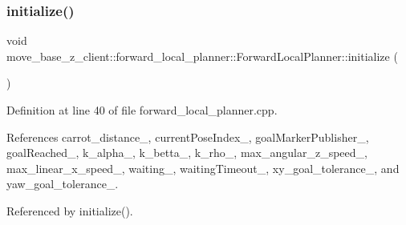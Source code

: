 \subsubsection{\texorpdfstring{initialize()}{initialize()}\hspace{0.1cm}{\footnotesize\ttfamily [3/3]}}
{\footnotesize\ttfamily void move\+\_\+base\+\_\+z\+\_\+client\+::forward\+\_\+local\+\_\+planner\+::\+Forward\+Local\+Planner\+::initialize (\begin{DoxyParamCaption}{ }\end{DoxyParamCaption})}



Definition at line 40 of file forward\+\_\+local\+\_\+planner.\+cpp.



References carrot\+\_\+distance\+\_\+, current\+Pose\+Index\+\_\+, goal\+Marker\+Publisher\+\_\+, goal\+Reached\+\_\+, k\+\_\+alpha\+\_\+, k\+\_\+betta\+\_\+, k\+\_\+rho\+\_\+, max\+\_\+angular\+\_\+z\+\_\+speed\+\_\+, max\+\_\+linear\+\_\+x\+\_\+speed\+\_\+, waiting\+\_\+, waiting\+Timeout\+\_\+, xy\+\_\+goal\+\_\+tolerance\+\_\+, and yaw\+\_\+goal\+\_\+tolerance\+\_\+.



Referenced by initialize().


